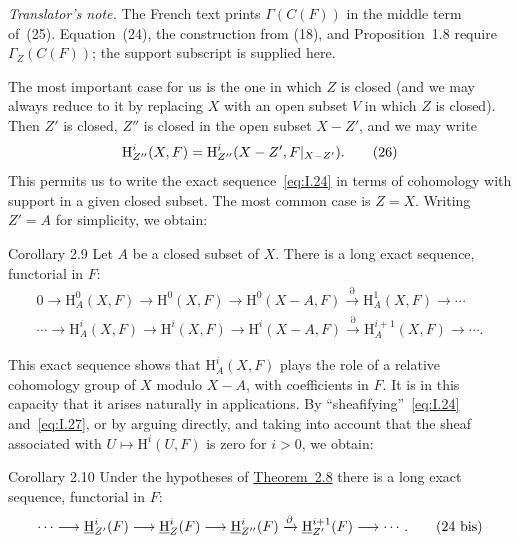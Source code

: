 \noindent\textit{Translator's note.} The French text prints
$\Gamma(C(F))$ in the middle term of~(25). Equation~(24), the construction
from (18), and Proposition~1.8 require $\Gamma_Z(C(F))$; the support
subscript is supplied here.

The most important case for us is the one in which $Z$ is closed (and we may
always reduce to it by replacing $X$ with an open subset $V$ in which $Z$ is
closed). Then $Z'$ is closed, $Z''$ is closed in the open subset $X-Z'$, and
we may write
\begin{equation}
  \mathrm H_{Z''}^i(X,F)
  =\mathrm H_{Z''}^i(X-Z',F\vert_{X-Z'}).
  \tag{26}\label{eq:I.26}
\end{equation}
This permits us to write the exact sequence~\eqref{eq:I.24} in terms of
cohomology with support in a given closed subset. The most common
case is $Z=X$. Writing $Z'=A$ for simplicity, we obtain:

\begin{sgastatement}{Corollary 2.9}
Let $A$ be a closed subset of $X$. There is a long exact sequence,
functorial in $F$:
\begin{equation}
\begin{gathered}
  0\longrightarrow \mathrm H_A^0(X,F)
  \longrightarrow \mathrm H^0(X,F)
  \longrightarrow \mathrm H^0(X-A,F)
  \xrightarrow{\partial} \mathrm H_A^1(X,F)\longrightarrow\cdots \\
  \cdots\longrightarrow \mathrm H_A^i(X,F)
  \longrightarrow \mathrm H^i(X,F)
  \longrightarrow \mathrm H^i(X-A,F)
  \xrightarrow{\partial} \mathrm H_A^{i+1}(X,F)
  \longrightarrow\cdots .
\end{gathered}
\tag{27}\label{eq:I.27}
\end{equation}
\end{sgastatement}

This exact sequence shows that $\mathrm H_A^i(X,F)$ plays the role of a
relative cohomology group of $X$ modulo $X-A$, with coefficients in $F$. It
is in this capacity that it arises naturally in applications. By
``sheafifying''~\eqref{eq:I.24} and~\eqref{eq:I.27}, or by arguing directly,
and taking into account that the sheaf associated with
$U\mapsto\mathrm H^i(U,F)$ is zero for $i>0$, we obtain:

\begin{sgastatement}{Corollary 2.10}
Under the hypotheses of \hyperref[I.2.8]{Theorem~2.8} there is a long exact sequence,
functorial in $F$:
\begin{equation}
  \cdots\longrightarrow \mathop{\underline{\mathrm H}}\nolimits_{Z'}^i(F)
  \longrightarrow \mathop{\underline{\mathrm H}}\nolimits_Z^i(F)
  \longrightarrow \mathop{\underline{\mathrm H}}\nolimits_{Z''}^i(F)
  \xrightarrow{\partial}\mathop{\underline{\mathrm H}}\nolimits_{Z'}^{i+1}(F)
  \longrightarrow\cdots .
  \tag{24 bis}\label{eq:I.24bis}
\end{equation}
\end{sgastatement}

